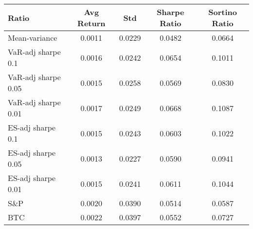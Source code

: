 \begin{tabular}{lcccc}
\toprule
Ratio & Avg Return & Std & Sharpe Ratio & Sortino Ratio\\
\midrule
Mean-variance & 0.0011 & 0.0229 & 0.0482 & 0.0664\\
VaR-adj sharpe 0.1 & 0.0016 & 0.0242 & 0.0654 & 0.1011\\
VaR-adj sharpe 0.05 & 0.0015 & 0.0258 & 0.0569 & 0.0830\\
VaR-adj sharpe 0.01 & 0.0017 & 0.0249 & 0.0668 & 0.1087\\
ES-adj sharpe 0.1 & 0.0015 & 0.0243 & 0.0603 & 0.1022\\
ES-adj sharpe 0.05 & 0.0013 & 0.0227 & 0.0590 & 0.0941\\
ES-adj sharpe 0.01 & 0.0015 & 0.0241 & 0.0611 & 0.1044\\
S\&P & 0.0020 & 0.0390 & 0.0514 & 0.0587\\
BTC & 0.0022 & 0.0397 & 0.0552 & 0.0727\\
\bottomrule
\end{tabular}
